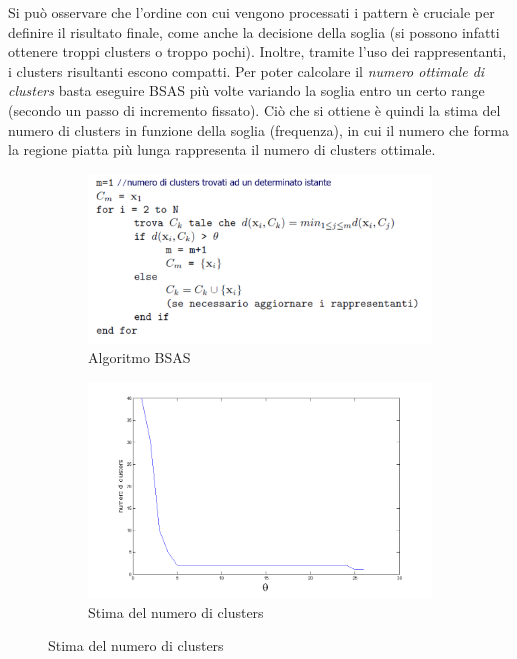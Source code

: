 \documentclass[a4paper,oneside,titlepage]{book}
\begin{document}
Si può osservare che l'ordine con cui vengono processati i pattern è cruciale per definire il risultato finale, come anche la decisione della soglia (si possono infatti ottenere troppi clusters o troppo pochi). Inoltre, tramite l'uso dei rappresentanti, i clusters risultanti escono compatti. Per poter calcolare il \textit{numero ottimale di clusters} basta eseguire BSAS più volte variando la soglia entro un certo range (secondo un passo di incremento fissato). Ciò che si ottiene è quindi la stima del numero di clusters in funzione della soglia (frequenza), in cui il numero che forma la regione piatta più lunga rappresenta il numero di clusters ottimale.
\begin{figure}[htp]
	\begin{subfigure}{0.49\textwidth}
	    \centering
		\includegraphics[width=\textwidth, height=\textheight, keepaspectratio]{bsas1.png}
		\caption{Algoritmo BSAS}
	\end{subfigure}
	\hfill
	\begin{subfigure}{0.49\textwidth}
	    \centering
		\includegraphics[width=\textwidth, height=\textheight, keepaspectratio]{bsas2.png}
		\caption{Stima del numero di clusters}
	\end{subfigure}
\end{figure}
\end{document}
